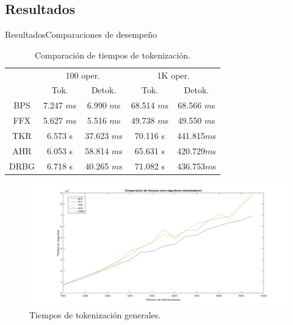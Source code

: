 %
%
%

\subsection{Resultados}

\begin{frame}{Resultados}{Comparaciones de desempeño}

  {
    {\small
      \begin{table}
        \begin{center}
          \begin{tabular}{c|c|c|c|c|}
            \cline{2-5}
            & \multicolumn{2}{c|}{100 oper.} & \multicolumn{2}{c|}{1K oper.} \\
            \cline{2-5}

            & Tok. & Detok. & Tok. & Detok. \\
            \hline
            \multicolumn{1}{|c|}{BPS} & 7.247 $m$s  & 6.990 $m$s  & 68.514 $m$s
              & 68.566 $m$s \\\cline{1-5}
            \multicolumn{1}{|c|}{FFX} & 5.627 $m$s  & 5.516 $m$s  & 49.738 $m$s
              & 49.550 $m$s \\\hline

            \multicolumn{1}{|c|}{TKR}   & 6.573 s  & 37.623 $m$s  & 70.116 s
              & 441.815$m$s \\\cline{1-5}
            \multicolumn{1}{|c|}{AHR}   & 6.053 s  & 58.814 $m$s  & 65.631 s
              & 420.729$m$s \\ \cline{1-5}
            \multicolumn{1}{|c|}{DRBG}  & 6.718 s  & 40.265 $m$s  & 71.082 s
              & 436.753$m$s \\\hline
          \end{tabular}

          \caption{Comparación de tiempos de tokenización.}
          \label{tabla:tiempos_tokenizacion}
        \end{center}
      \end{table}
    }
  }

  {
    \begin{figure}[H]
      \begin{center}
        \includegraphics[width=1.0\linewidth]
          {../../../diagramas_comunes/desempenio/tok_todos.png}
        \caption{Tiempos de tokenización generales.}
      \end{center}
    \end{figure}
  }


\end{frame}

